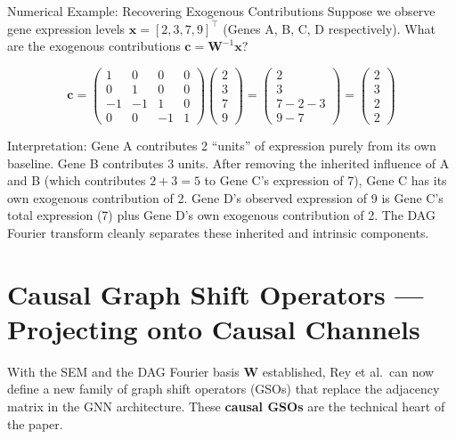 \begin{examplebox}{Numerical Example: Recovering Exogenous Contributions}
Suppose we observe gene expression levels $\mathbf{x} = [2, 3, 7, 9]^\top$
(Genes A, B, C, D respectively). What are the exogenous contributions
$\mathbf{c} = \mathbf{W}^{-1}\mathbf{x}$?

\[
    \mathbf{c} = \begin{pmatrix}1&0&0&0\\0&1&0&0\\-1&-1&1&0\\0&0&-1&1\end{pmatrix}
    \begin{pmatrix}2\\3\\7\\9\end{pmatrix}
    = \begin{pmatrix}2\\3\\7-2-3\\9-7\end{pmatrix}
    = \begin{pmatrix}2\\3\\2\\2\end{pmatrix}
\]

Interpretation: Gene A contributes 2 ``units'' of expression purely from its
own baseline. Gene B contributes 3 units. After removing the inherited
influence of A and B (which contributes $2+3=5$ to Gene C's expression of 7),
Gene C has its own exogenous contribution of 2. Gene D's observed expression
of 9 is Gene C's total expression (7) plus Gene D's own exogenous contribution
of 2. The DAG Fourier transform cleanly separates these inherited and
intrinsic components.
\end{examplebox}

\section{Causal Graph Shift Operators --- Projecting onto Causal Channels}
\label{sec:dagcn_gso}

With the SEM and the DAG Fourier basis $\mathbf{W}$ established, Rey et al.\
can now define a new family of graph shift operators (GSOs) that replace the
adjacency matrix in the GNN architecture. These \textbf{causal GSOs} are the
technical heart of the paper.

